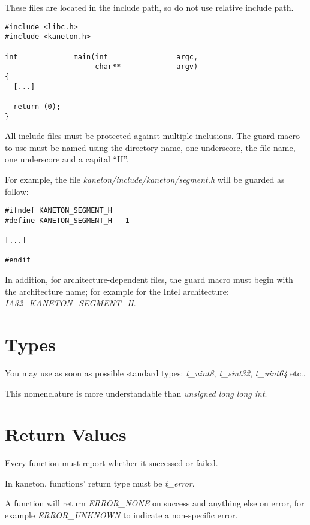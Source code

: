 These files are located in the include path, so do not use relative include
path.

\begin{verbatim}
#include <libc.h>
#include <kaneton.h>

int             main(int                argc,
                     char**             argv)
{
  [...]

  return (0);
}
\end{verbatim}

All include files must be protected against multiple inclusions. The
guard macro to use must be named using the directory name, one underscore,
the file name, one underscore and a capital ``H''.

For example, the file \textit{kaneton/include/kaneton/segment.h} will be
guarded as follow:

\begin{verbatim}
#ifndef KANETON_SEGMENT_H
#define KANETON_SEGMENT_H	1

[...]

#endif
\end{verbatim}

In addition, for architecture-dependent files, the guard macro must begin
with the architecture name; for example for the Intel architecture:
\textit{IA32\_KANETON\_SEGMENT\_H}.

%
%

\section{Types}

You may use as soon as possible standard types: \textit{t\_uint8},
\textit{t\_sint32}, \textit{t\_uint64} etc..

This nomenclature is more understandable than
\textit{unsigned long long int}.

%
%

\section{Return Values}

Every function must report whether it successed or failed.

In kaneton, functions' return type must be \textit{t\_error}.

A function will return \textit{ERROR\_NONE} on success and anything
else on error, for example \textit{ERROR\_UNKNOWN} to indicate a non-specific
error.

